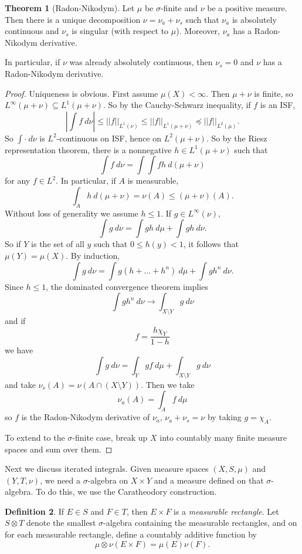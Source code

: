 \documentclass[12pt]{report}
\newcommand{\dfn}[1]{\emph{#1}\index{#1}}
\theoremstyle{definition}
\newtheorem{theorem}{Theorem}[chapter]
\newtheorem{definition}[theorem]{Definition}
\begin{document}
\begin{theorem}[Radon-Nikodym]
    Let $\mu$ be $\sigma$-finite and $\nu$ be a positive measure. Then there is a unique decomposition $\nu = \nu_a + \nu_s$ such that $\nu_a$ is absolutely continuous and $\nu_s$ is singular (with respect to $\mu$). Moreover, $\nu_a$ has a Radon-Nikodym derivative.
\end{theorem}
    In particular, if $\nu$ was already absolutely continuous, then $\nu_s = 0$ and $\nu$ has a Radon-Nikodym derivative.
\begin{proof}
    Uniqueness is obvious. First assume $\mu(X) < \infty$. Then $\mu + \nu$ is finite, so $L^\infty(\mu + \nu) \subseteq L^1(\mu + \nu)$. So by the Cauchy-Schwarz inequality, if $f$ is an ISF,
    $$\left|\int f ~d\nu\right| \leq ||f||_{L^1(\nu)} \leq ||f||_{L^1(\mu+\nu)} \preceq ||f||_{L^2(\mu)}.$$
    So $\int \cdot ~d\nu$ is $L^2$-continuous on ISF, hence on $L^2(\mu + \nu)$. So by the Riesz representation theorem, there is a nonnegative $h \in L^1(\mu + \nu)$ such that
    $$\int f ~d\nu = \int \int fh ~d(\mu + \nu)$$
    for any $f \in L^2$. In particular, if $A$ is measurable,
    $$\int_A h ~d(\mu + \nu) = \nu(A) \leq (\mu + \nu)(A).$$
    Without loss of generality we assume $h \leq 1$. If $g \in L^\infty(\nu)$,
    $$\int g ~d\nu = \int gh ~d\mu + \int gh ~d\nu.$$
    So if $Y$ is the set of all $y$ such that $0 \leq h(y) < 1$, it follows that $\mu(Y) = \mu(X)$. By induction,
    $$\int g ~d\nu = \int g(h + \dots + h^n) ~d\mu + \int gh^n ~d\nu.$$
    Since $h \leq 1$, the dominated convergence theorem implies
    $$\int gh^n ~d\nu \to \int_{X \setminus Y} g ~d\nu$$
    and if
    $$f = \frac{h\chi_Y}{1-h}$$
    we have
    $$\int g ~d\nu = \int_Y gf ~d\mu + \int_{X \setminus Y} g ~d\nu$$
    and take $\nu_s(A) = \nu(A \cap (X \setminus Y))$. Then we take
    $$\nu_a(A) = \int_A f ~d\mu$$
    so $f$ is the Radon-Nikodym derivative of $\nu_a$, $\nu_a + \nu_s = \nu$ by taking $g = \chi_A$.

    To extend to the $\sigma$-finite case, break up $X$ into countably many finite measure spaces and sum over them.
\end{proof}
    Next we discuss iterated integrals. Given measure spaces $(X, S, \mu)$ and $(Y, T, \nu)$, we need a $\sigma$-algebra on $X \times Y$ and a measure defined on that $\sigma$-algebra. To do this, we use the Caratheodory construction.
\begin{definition}
    If $E \in S$ and $F \in T$, then $E \times F$ is a \dfn{measurable rectangle}. Let $S \otimes T$ denote the smallest $\sigma$-algebra containing the measurable rectangles, and on for each measurable rectangle, define a countably additive function by
    $$\mu \otimes \nu(E \times F) = \mu(E) \nu(F).$$
\end{definition}
\end{document}
